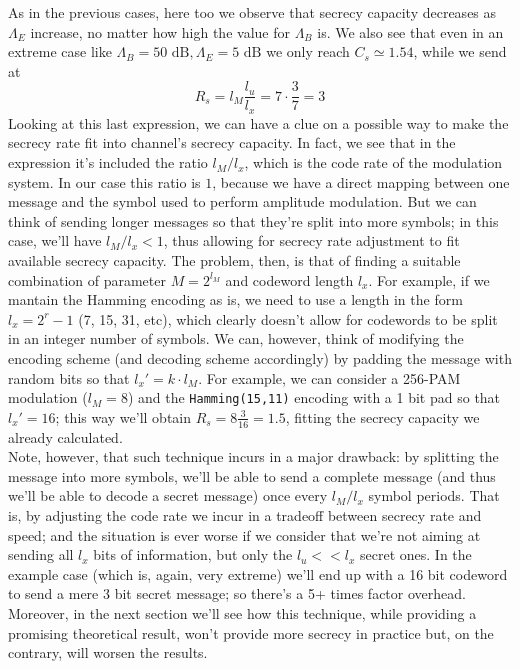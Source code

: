\documentclass[a4paper,12pt,titlepage]{article}
\begin{document}
As in the previous cases, here too we observe that secrecy capacity decreases as
$\Lambda_E$ increase, no matter how high the value for $\Lambda_B$ is. We
also see that even in an extreme case like $\Lambda_B = 50 \text{ dB},
\Lambda_E = 5 \text{ dB}$ we only reach $C_s \simeq 1.54$, while we send at
\[
  R_s = l_M \frac{l_u}{l_x} = 7 \cdot \frac{3}{7} = 3 
\]
Looking at this last expression, we can have a clue on a possible way to make
the secrecy rate fit into channel's secrecy capacity. In fact, we see that in
the expression it's included the ratio $l_M / l_x$, which is the code rate of
the modulation system. In our case this
ratio is $1$, because we have a direct mapping between one message and the
symbol used to perform amplitude modulation. But we can think of sending
longer messages so that they're split into more symbols; in this case, we'll
have $l_M / l_x < 1$, thus allowing for secrecy rate adjustment to fit
available secrecy capacity.
The problem, then, is that of finding a suitable combination of
parameter $M = 2^{l_M}$ and codeword length $l_x$. For example, if we mantain
the Hamming encoding as is, we need to use a length in the form $l_x = 2^r -1$
(7, 15, 31, etc), which clearly doesn't allow for codewords to be split in an
integer number of symbols. We can, however, think of modifying the encoding
scheme (and decoding scheme accordingly) by padding the message with random
bits so that $l_x' = k \cdot l_M$. For example, we can consider a 256-PAM
modulation ($l_M = 8$) and the \texttt{Hamming(15,11)} encoding with a 1 bit
pad so that $l_x' = 16$; this way we'll obtain $R_s = 8 \frac{3}{16} = 1.5$,
fitting the secrecy capacity we already calculated. \\
Note, however, that such technique incurs in a major drawback: by splitting the
message into more symbols, we'll be able to send a complete message (and thus
we'll be able to decode a secret message) once every $l_M /
l_x$ symbol periods. That is, by adjusting the code rate we incur in a tradeoff
between secrecy rate and speed; and the situation is ever worse if we consider
that we're not aiming at sending all $l_x$ bits of information, but only the
$l_u << l_x$ secret ones. In the example case (which is, again, very extreme)
we'll end up with a 16 bit codeword to send a mere 3 bit secret message; so
there's a 5+ times factor overhead. \\
Moreover, in the next section we'll see how this technique, while providing a
promising theoretical result, won't provide more secrecy in practice but, on
the contrary, will worsen the results.
\end{document}
